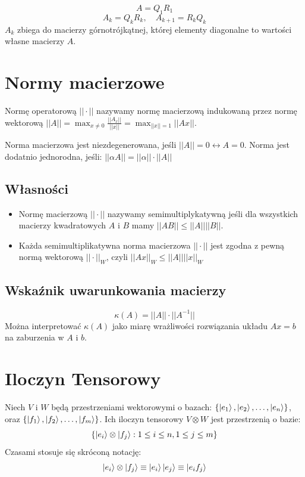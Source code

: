\documentclass{../notatki}
\begin{document}
$$
A = Q_1R_1
$$
$$
A_k = Q_kR_k, \quad A_{k + 1} = R_kQ_k
$$
$A_k$ zbiega do macierzy górnotrójkątnej, której elementy diagonalne to wartości
własne macierzy $A$.

\section{Normy macierzowe}

Normę operatorową $||\cdot||$ nazywamy normę macierzową indukowaną przez normę
wektorową $||A|| = \max_{x \neq 0} \frac{||A_x||}{||x||} =
\max_{||x||=1}||Ax||$.

Norma macierzowa jest niezdegenerowana, jeśli $||A|| = 0 \leftrightarrow A = 0$.
Norma jest dodatnio jednorodna, jeśli: $||\alpha A|| = ||\alpha|| \cdot ||A||$

\subsection{Własności}

\begin{itemize}
  \item Normę macierzową $||\cdot||$ nazywamy semimultiplykatywną
    jeśli dla wszystkich macierzy kwadratowych $A$ i $B$ mamy $||AB||
    \leq ||A|| ||B||$.
  \item  Każda semimultiplikatywna norma macierzowa $||\cdot||$ jest zgodna z
    pewną normą wektorową $||\cdot||_W$, czyli $||Ax||_W \leq ||A|| ||x||_W$
\end{itemize}

\subsection{Wskaźnik uwarunkowania macierzy}

$$
\kappa(A) = ||A|| \cdot ||A^{-1}||
$$
Można interpretować $\kappa(A)$ jako miarę wrażliwości rozwiązania układu
$Ax = b$ na zaburzenia w $A$ i $b$.

\section{Iloczyn Tensorowy}

Niech $V$ i $W$ będą przestrzeniami wektorowymi o bazach:
$\{\ket{e_1}, \ket{e_2}, \dots, \ket{e_n}\}$, oraz $\{\ket{f_1},
\ket{f_2}, \dots, \ket{f_m}\}$. Ich iloczyn tensorowy $V \otimes W$
jest przestrzenią o bazie:
$$
\{\ket{e_i} \otimes \ket{f_j} : 1 \leq i \leq n, 1 \leq j \leq m\}
$$
Czasami stosuje się skróconą notację:
$$
\ket{e_i} \otimes \ket{f_j} \equiv \ket{e_i}\ket{e_j} \equiv \ket{e_i f_j}
$$
\end{document}
